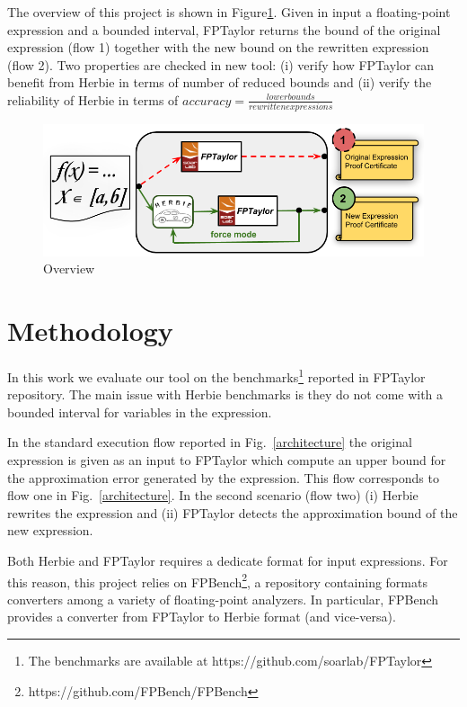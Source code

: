 \documentclass[runningheads]{llncs}
\begin{document}
The overview of this project is shown in Figure\ref{fig:architecture}. Given in input a floating-point expression and a bounded interval, FPTaylor returns the bound of the original expression (flow 1) together with the new bound on the rewritten expression (flow 2). 
Two properties are checked in new tool: (i) verify how FPTaylor can benefit from Herbie in terms of number of reduced bounds and (ii) verify the reliability of Herbie in terms of $accuracy= \frac{lower bounds}{rewritten expressions}$
\begin{figure}[t]
	\begin{center}
		\includegraphics[width=\columnwidth]{picture}
	\end{center}
	\caption{Overview}\label{fig:architecture}
\end{figure}

\section{Methodology}
In this work we evaluate our tool on the benchmarks\footnote{The benchmarks are available at https://github.com/soarlab/FPTaylor} reported in FPTaylor~\cite{fptaylor} repository. The main issue with Herbie benchmarks is they do not come with a bounded interval for variables in the expression.

In the standard execution flow reported in Fig.~\ref{architecture} the original expression is given as an input to FPTaylor which compute an upper bound for the approximation error generated by the expression. This flow corresponds to flow one in Fig.~\ref{architecture}.
In the second scenario (flow two) (i) Herbie rewrites the expression and (ii) FPTaylor detects the approximation bound of the new expression.

Both Herbie and FPTaylor requires a dedicate format for input expressions. For this reason, this project relies on FPBench\footnote{https://github.com/FPBench/FPBench}, a repository containing formats converters among a variety of floating-point analyzers. 
In particular, FPBench provides a converter from FPTaylor to Herbie format (and vice-versa).
\end{document}
